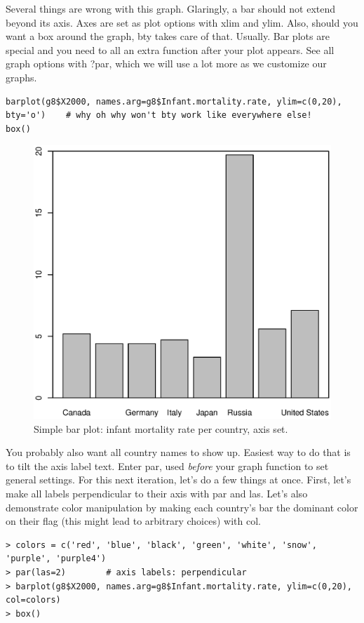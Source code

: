 \documentclass{report}
\newcommand{\code}[1]{\textsf{\ttfamily #1}}
\begin{document}
	Several things are wrong with this graph. Glaringly, a bar should not extend beyond its axis. Axes are set as plot options with \code{xlim} and \code{ylim}. Also, should you want a box around the graph, \code{bty} takes care of that. Usually. Bar plots are special and you need to all an extra function after your plot appears. See all graph options with \code{?par}, which we will use a lot more as we customize our graphs.
	\begin{verbatim}
barplot(g8$X2000, names.arg=g8$Infant.mortality.rate, ylim=c(0,20), bty='o')	# why oh why won't bty work like everywhere else!
box()
	\end{verbatim}
	\begin{figure}[h]
		\centering
		\includegraphics[width=1.0\textwidth]{baraxis.eps}
		\caption{Simple bar plot: infant mortality rate per country, axis set.}
		\label{fig:baraxis}
	\end{figure}

	You probably also want all country names to show up. Easiest way to do that is to tilt the axis label text. Enter \code{par}, used \emph{before} your graph function to set general settings. For this next iteration, let's do a few things at once. First, let's make all labels perpendicular to their axis with \code{par} and \code{las}. Let's also demonstrate color manipulation by making each country's bar the dominant color on their flag (this might lead to arbitrary choices) with \code{col}.
	\begin{verbatim}
> colors = c('red', 'blue', 'black', 'green', 'white', 'snow', 'purple', 'purple4')
> par(las=2)		# axis labels: perpendicular
> barplot(g8$X2000, names.arg=g8$Infant.mortality.rate, ylim=c(0,20), col=colors)
> box()
	\end{verbatim}
\end{document}
